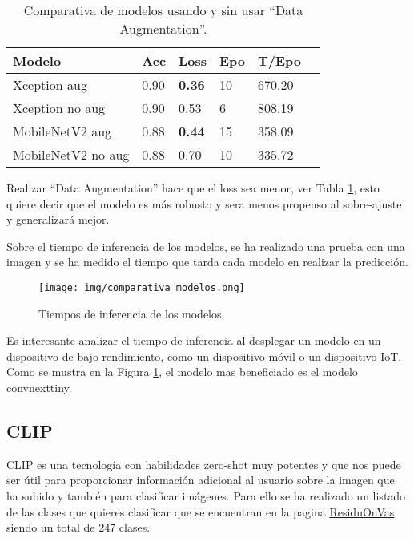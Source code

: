 \documentclass[10pt,a4paper,twocolumn,twoside]{article}
\begin{document}
\begin{table}[h]
  \centering
  \begin{tabular}{llllll}
    \toprule
    \textbf{Modelo}               & \textbf{Acc} & \textbf{Loss} & \textbf{Epo} & \textbf{T/Epo} \\ 
    \midrule
    Xception aug              & 0.90              & \textbf{0.36}                    & 10             & 670.20              \\
    Xception no aug              & 0.90              & 0.53                   & 6              & 808.19              \\
    \midrule
    MobileNetV2 aug           & 0.88              & \textbf{0.44}                      & 15             & 358.09              \\
    MobileNetV2 no aug           & 0.88              & 0.70                      & 10             & 335.72              \\
    \bottomrule
  \end{tabular}
  \caption{Comparativa de modelos usando y sin usar ``Data Augmentation''.}
  \label{table:pretrained_models_aug}
\end{table}

Realizar ``Data Augmentation'' hace que el loss sea menor, ver Tabla \ref{table:pretrained_models_aug}, esto quiere decir que el modelo es más robusto
y sera menos propenso al sobre-ajuste y generalizará mejor.

Sobre el tiempo de inferencia de los modelos, se ha realizado una prueba con una imagen y se ha medido el tiempo que tarda
cada modelo en realizar la predicción.

\begin{figure}[h]
  \centering
  \texttt{[image: img/comparativa modelos.png]}
  \caption{Tiempos de inferencia de los modelos.}
  \label{fig:infertime}
\end{figure}

Es interesante analizar el tiempo de inferencia al desplegar un modelo en un dispositivo de bajo rendimiento, como un dispositivo móvil o un dispositivo IoT. Como se
mustra en la Figura \ref{fig:infertime}, el modelo mas beneficiado es el modelo convnexttiny.

\subsection{CLIP}

CLIP es una tecnología con habilidades zero-shot muy potentes y que nos puede ser útil para proporcionar información adicional al usuario sobre la imagen que ha subido y también para clasificar
imágenes. Para ello se ha realizado un listado de las clases que quieres clasificar que se encuentran en la pagina \href{https://www.residuonvas.cat/ca}{ResiduOnVas} siendo un total de 247 clases.
\end{document}
